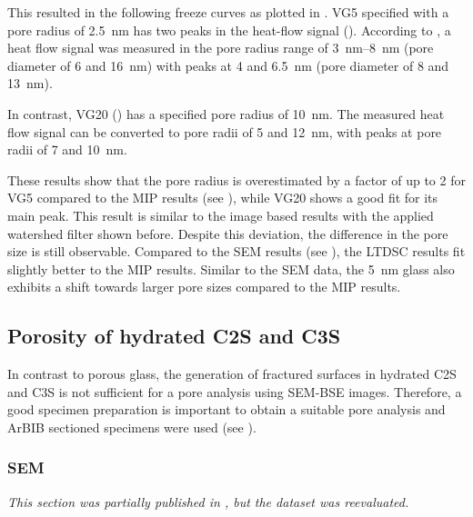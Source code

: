 This resulted in the following freeze curves as plotted in .
\acs{VG5} specified with a pore radius of \qty{2.5}{\nano\meter} has two peaks in the heat-flow signal ().
According to  \cite{brun.1977}, a heat flow signal was measured in the pore radius range of \qtyrange{3}{8}{\nano\meter} (pore diameter of \num{6} and \qty{16}{\nano\meter}) with peaks at \num{4} and \qty{6.5}{\nano\meter} (pore diameter of \num{8} and \qty{13}{\nano\meter}).

In contrast, \acs{VG20} () has a specified pore radius of \qty{10}{\nano\meter}. The measured heat flow signal can be converted to pore radii of \num{5} and \qty{12}{\nano\meter}, with peaks at pore radii of \num{7} and \qty{10}{\nano\meter}.

These results show that the pore radius is overestimated by a factor of up to \num{2} for \acs{VG5} compared to the \ac{MIP} results (see ), while \acs{VG20} shows a good fit for its main peak.
This result is similar to the image based results with the applied watershed filter shown before.
Despite this deviation, the difference in the pore size is still observable.
Compared to the \ac{SEM} results (see ), the \ac{LTDSC} results fit slightly better to the \ac{MIP} results.
Similar to the \ac{SEM} data, the \qty{5}{\nano\meter} glass also exhibits a shift towards larger pore sizes compared to the \ac{MIP} results.



\FloatBarrier
\subsection{Porosity of hydrated \acs*{C2S} and \acs*{C3S}}

In contrast to porous glass, the generation of fractured surfaces in hydrated \ac{C2S} and \ac{C3S} is not sufficient for a pore analysis using \ac{SEM}-\ac{BSE} images.
Therefore, a good specimen preparation is important to obtain a suitable pore analysis and \ac{ArBIB} sectioned specimens were used (see ).

\subsubsection{\acs*{SEM}}
\label{subsec:pores_C3S_SEM}

\textit{This section was partially published in \cite{kleiner.2021a}, but the dataset was reevaluated.}

